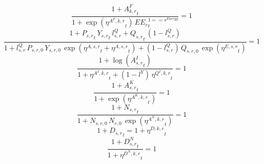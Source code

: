 \noindent[name= `sector TFP final demand 1 1']
\begin{dmath}
\frac{1+{{A^{F}_{k,r}}}_{t}}{1+\exp\left({{\eta^{A^F,k,r}}}_{t}\right)\, {{EE_r}}_{t}^{1=={{s^{Energy}}}}}=1
\end{dmath}
\noindent[name= `sector TFP 1 1']
\begin{dmath}
\frac{1+{{P_{s,r}}}_{t}\, {{Y_{s,r}}}_{t}\, {{l^{Q}_{s,r}}}+{{Q_{s,r}}}_{t}\, \left(1-{{l^{Q}_{s,r}}}\right)}{1+{{l^{Q}_{s,r}}}\, {{P_{s,r,0}}}\, {{Y_{s,r,0}}}\, \exp\left({{\eta^{A,s,r}}}_{t}+{{\eta^{A,s,r}}}_{t}\right)+\left(1-{{l^{Q}_{s,r}}}\right)\, {{Q_{s,r,0}}}\, \exp\left({{\eta^{E,s,r}}}_{t}\right)}=1
\end{dmath}
\noindent[name= `intermediate input productivity 1 1']
\begin{dmath}
\frac{1+\log\left({{A^{I}_{s,r}}}_{t}\right)}{1+{{\eta^{A^{I},k,r}}}_{t}+\left(1-{{l^{Y}}}\right)\, {{\eta^{Q^{I},k,r}}}_{t}}=1
\end{dmath}
\noindent[name= `capital productivity shock 1 1']
\begin{dmath}
\frac{1+{{A^{K}_{s,r}}}_{t}}{1+\exp\left({{\eta^{A^{K},k,r}}}_{t}\right)}=1
\end{dmath}
\noindent[name= `exogenous labour input 1 1']
\begin{dmath}
\frac{1+{{N_{s,r}}}_{t}}{1+{{N_{s,r,0}}}\, {{N_{r,0}}}\, \exp\left({{\eta^{A^{N},k,r}}}_{t}\right)}=1
\end{dmath}
\noindent[name= `TFP damage 1 1']
\begin{dmath}
1+{{D_{s,r}}}_{t}=1+{{\eta^{D,k,r}}}_{t}
\end{dmath}
\noindent[name= `labour damage 1 1']
\begin{dmath}
\frac{1+{{D^N_{s,r}}}_{t}}{1+{{\eta^{D^{N},k,r}}}_{t}}=1
\end{dmath}
\noindent[name= `capital damage 1 1']
